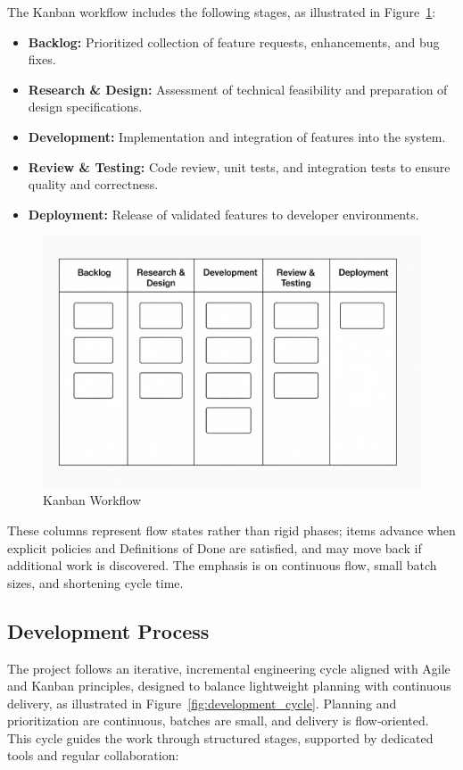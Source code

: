 \begin{spacing}{1.2}
The Kanban workflow includes the following stages, as illustrated in Figure~\ref{fig:kanban_workflow}:

\begin{itemize}
    \item \textbf{Backlog:} Prioritized collection of feature requests, enhancements, and bug fixes.
    \item \textbf{Research \& Design:} Assessment of technical feasibility and preparation of design specifications.
    \item \textbf{Development:} Implementation and integration of features into the system.
    \item \textbf{Review \& Testing:} Code review, unit tests, and integration tests to ensure quality and correctness.
    \item \textbf{Deployment:} Release of validated features to developer environments.
\end{itemize}

\begin{figure}[H]
    \centering
    \includegraphics[scale=0.2]{Images/kanban.png}
    \caption{Kanban Workflow}
    \label{fig:kanban_workflow}
\end{figure}

These columns represent flow states rather than rigid phases; items advance when explicit policies and Definitions of Done are satisfied, and may move back if additional work is discovered. The emphasis is on continuous flow, small batch sizes, and shortening cycle time.


\subsection{Development Process}
The project follows an iterative, incremental engineering cycle aligned with Agile and Kanban principles, designed to balance lightweight planning with continuous delivery, as illustrated in Figure~\ref{fig:development_cycle}. Planning and prioritization are continuous, batches are small, and delivery is flow‑oriented. This cycle guides the work through structured stages, supported by dedicated tools and regular collaboration:


\end{spacing}
